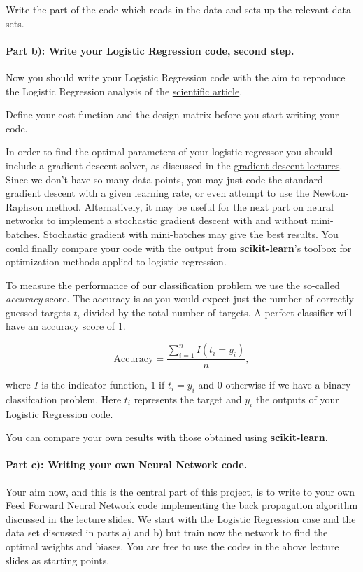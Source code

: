 \documentclass[%
oneside,                 %
final,                   %
10pt]{article}
\begin{document}
Write the part of the code which reads in the data and sets up the relevant data sets. 

\paragraph{Part b): Write your Logistic Regression code, second step.}
Now you should write your Logistic Regression code with the aim to
reproduce the Logistic Regression analysis of the \href{{https://bradzzz.gitbooks.io/ga-seattle-dsi/content/dsi/dsi_05_classification_databases/2.1-lesson/assets/datasets/DefaultCreditCardClients_yeh_2009.pdf}}{scientific
article}.

Define your cost function and the design matrix before you start writing your code.

In order to find the optimal parameters of your logistic regressor you
should include a gradient descent solver, as discussed in the
\href{{https://compphysics.github.io/MachineLearning/doc/pub/Splines/html/Splines-bs.html}}{gradient descent
lectures}.
Since we don't have so many data points, you may just code the
standard gradient descent with a given learning rate, or even attempt
to use the Newton-Raphson method.  Alternatively, it may be useful for
the next part on neural networks to implement a stochastic gradient
descent with and without mini-batches. Stochastic gradient with
mini-batches may give the best results. You could finally compare your
code with the output from \textbf{scikit-learn}'s toolbox for optimization
methods applied to logistic regression.


To measure the performance of our classification problem we use the
so-called \emph{accuracy} score.  The accuracy is as you would expect just
the number of correctly guessed targets $t_i$ divided by the total
number of targets. A perfect classifier will have an accuracy score of
$1$.

\[ 
\text{Accuracy} = \frac{\sum_{i=1}^n I(t_i = y_i)}{n} ,
\]

where $I$ is the indicator function, $1$ if $t_i = y_i$ and $0$
otherwise if we have a binary classifcation problem. Here $t_i$
represents the target and $y_i$ the outputs of your Logistic
Regression code.


You can compare your own results with those obtained using
\textbf{scikit-learn}.


\paragraph{Part c): Writing your own Neural Network code.}
Your aim now, and this is the central part of this project, is to
write to your own Feed Forward Neural Network  code implementing the back
propagation algorithm discussed in the \href{{https://compphysics.github.io/MachineLearning/doc/pub/NeuralNet/html/NeuralNet-bs.html}}{lecture
slides}. We
start with the Logistic Regression  case and the data set discussed in parts a) and b) but train
now the network to find the optimal weights and biases. You are free
to use the codes in the above lecture slides as starting points.
\end{document}
